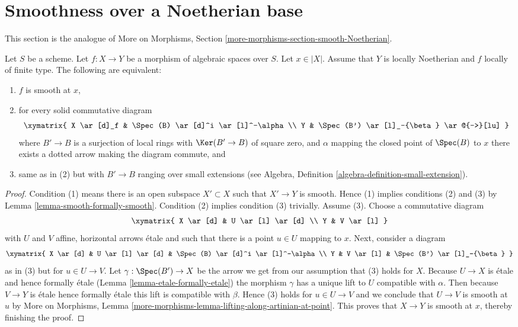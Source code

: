 \section{Smoothness over a Noetherian base}
\label{section-smooth-Noetherian}

\noindent
This section is the analogue of
More on Morphisms, Section \ref{more-morphisms-section-smooth-Noetherian}.

\begin{lemma}
\label{lemma-lifting-along-artinian-at-point}
Let $S$ be a scheme. Let $f : X \to Y$ be a morphism of algebraic spaces
over $S$. Let $x \in |X|$.
Assume that $Y$ is locally Noetherian and $f$ locally of finite type.
The following are equivalent:
\begin{enumerate}
\item $f$ is smooth at $x$,
\item for every solid commutative diagram
$$
\xymatrix{
X \ar[d]_f & \Spec(B) \ar[d]^i \ar[l]^-\alpha \\
Y & \Spec(B') \ar[l]_-{\beta} \ar@{-->}[lu]
}
$$
where $B' \to B$ is a surjection of local rings with
$\Ker(B' \to B)$ of square zero, and $\alpha$ mapping the
closed point of $\Spec(B)$ to $x$ there exists
a dotted arrow making the diagram commute, and
\item same as in (2) but with $B' \to B$ ranging over small
extensions (see Algebra, Definition \ref{algebra-definition-small-extension}).
\end{enumerate}
\end{lemma}

\begin{proof}
Condition (1) means there is an open subspace $X' \subset X$
such that $X' \to Y$ is smooth. Hence (1) implies conditions (2) and (3) by
Lemma \ref{lemma-smooth-formally-smooth}. Condition (2) implies
condition (3) trivially. Assume (3). Choose a commutative diagram
$$
\xymatrix{
X \ar[d] & U \ar[l] \ar[d] \\
Y & V \ar[l]
}
$$
with $U$ and $V$ affine, horizontal arrows \'etale and
such that there is a point $u \in U$ mapping to $x$. Next, consider
a diagram
$$
\xymatrix{
X \ar[d] & U \ar[l] \ar[d] & \Spec(B) \ar[d]^i \ar[l]^-\alpha  \\
Y & V \ar[l] & \Spec(B') \ar[l]_-{\beta}
}
$$
as in (3) but for $u \in U \to V$. Let $\gamma : \Spec(B') \to X$
be the arrow we get from our assumption that (3) holds for $X$.
Because $U \to X$ is \'etale and
hence formally \'etale (Lemma \ref{lemma-etale-formally-etale})
the morphism $\gamma$
has a unique lift to $U$ compatible with $\alpha$. Then because
$V \to Y$ is \'etale hence formally \'etale this lift is compatible
with $\beta$. Hence (3) holds for $u \in U \to V$ and we conclude
that $U \to V$ is smooth at $u$ by
More on Morphisms, Lemma
\ref{more-morphisms-lemma-lifting-along-artinian-at-point}.
This proves that $X \to Y$ is smooth at $x$, thereby
finishing the proof.
\end{proof}


